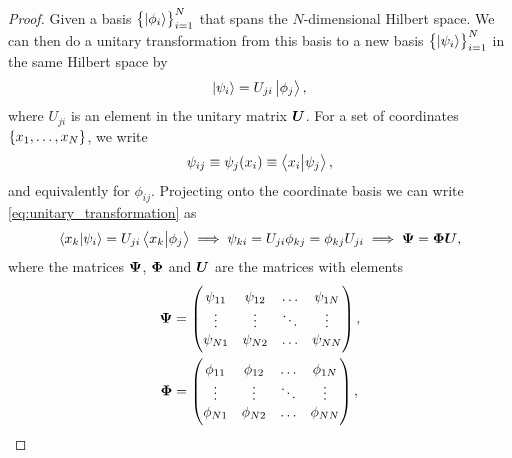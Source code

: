         \begin{proof}
            \label{proof:slater_determinants_invariant}
            Given a basis $\left\{ \ket{\phi_i} \right\}_{i = 1}^{N}$ that spans the
            $N$-dimensional Hilbert space. We can then do a unitary
            transformation from this basis to a new basis
            $\left\{ \ket{\psi_i} \right\}_{i = 1}^{N}$ in the same Hilbert space by
            \begin{align}
                \ket{\psi_i} = U_{ji}\ket{\phi_j},
                \label{eq:unitary_transformation}
            \end{align}
            where $U_{ji}$ is an element in the unitary matrix $\boldsymbol{U}$.
            For a set of coordinates
            $\left\{ x_1, \dots, x_N \right\}$, we write
            \begin{align}
                \psi_{ij} \equiv \psi_j(x_i)
                \equiv \braket{x_i}{\psi_j},
            \end{align}
            and equivalently for $\phi_{ij}$. Projecting onto the coordinate
            basis we can write \autoref{eq:unitary_transformation} as
            \begin{gather}
                \braket{x_k}{\psi_i}
                = U_{ji}\braket{x_k}{\phi_j}
                \implies
                \psi_{ki} = U_{ji}\phi_{kj} = \phi_{kj}U_{ji}
                \implies \boldsymbol{\Psi} = \boldsymbol{\Phi}\boldsymbol{U},
            \end{gather}
            where the matrices $\boldsymbol{\Psi}$, $\boldsymbol{\Phi}$ and $\boldsymbol{U}$ are
            the matrices with elements
            \begin{align}
                \vfg{\Psi}
                &= \begin{pmatrix}
                    \psi_{11} & \psi_{12} & \dots & \psi_{1N} \\
                    \vdots & \vdots & \ddots & \vdots \\
                    \psi_{N1} & \psi_{N2} & \dots & \psi_{NN}
                \end{pmatrix}, \\
                \vfg{\Phi}
                &= \begin{pmatrix}
                    \phi_{11} & \phi_{12} & \dots & \phi_{1N} \\
                    \vdots & \vdots & \ddots & \vdots \\
                    \phi_{N1} & \phi_{N2} & \dots & \phi_{NN}
                \end{pmatrix}, \\

\end{align}
\end{proof}
